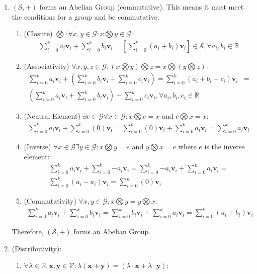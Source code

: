 \documentclass[a4paper,12pt]{article}
\newcommand{\set}[1]{\mathcal{#1}}
\newcommand{\operation}{\bigotimes}
\newcommand{\vectr}[1]{\textbf{#1}}
\newcommand{\real}{\mathbb{R}}
\newcommand{\lcomb}[1]{\sum_{i = 0}^{k} {#1} \vectr{v}_i}
\begin{document}
	\begin{enumerate}
		\item $ (\set{S}, +) $ forms an Abelian Group (commutative). This means it must meet the conditions for a group and be commutative:
		\begin{enumerate}
			\item (Closure)  $ \operation : \forall x,y \in \set{G} : x \operation y \in \set{G} $:
			\begin{align}
				\lcomb{a_i} + \lcomb{b_i} = \left[ \lcomb{(a_i + b_i)} \right] \in \set{S}, \forall a_i, b_i \in \real 
			\end{align}
			\item (Associativity) $ \forall x, y, z \in \set{G} : (x \operation y) \operation z = x \operation (y \operation z) $:
			\begin{align}
				\lcomb{a_i} + (\lcomb{b_i} + \lcomb{c_i}) = \lcomb{(a_i + b_i + c_i)} &=\\ (\lcomb{a_i} + \lcomb{b_i}) + \lcomb{c_i}, \forall a_i,b_i,c_i \in \real
			\end{align}
			\item (Neutral Element) $ \exists e  \in \set{G} \forall x \in \set{G} : x \operation e = x$ and $ e \operation x = x $:
			\begin{align}
				\lcomb{a_i} + \lcomb{(0)} = \lcomb{(0)} + \lcomb{a_i} = \lcomb{a_i}
			\end{align}
			\item (Inverse)  $ \forall x \in \set{G} \exists y \in \set{G} :  x \operation y = e$ and $ y \operation x = e $ where $ e $ is the inverse element: 
			\begin{align}
				\lcomb{a_i} + \lcomb{-a_i} = \lcomb{-a_i} + \lcomb{a_i} =\\ \lcomb{(a_i - a_i)} = \lcomb{(0)}
			\end{align}
			\item (Commutativity) $ \forall x, y \in \set{G}, x \operation y = y \operation x $:
			\begin{align}
				\lcomb{a_i} + \lcomb{b_i} = \lcomb{b_i} + \lcomb{a_i} = \lcomb{(a_i + b_i)}
			\end{align}
		\end{enumerate}
		Therefore, $ (\set{S}, +) $ forms an Abelian Group. 
		\item (Distributivity):
		\begin{enumerate}
			\item $\forall \lambda \in \real, \vectr{x}, \vectr{y} \in \mathcal{V}: \lambda (\vectr{x} + \vectr{y}) = (\lambda \cdot \vectr{x} + \lambda \cdot \vectr{y})$:

\end{enumerate}
\end{enumerate}
\end{document}

